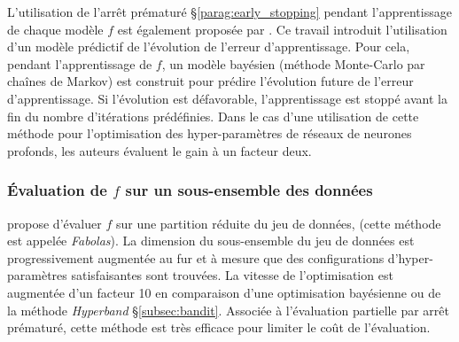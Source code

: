 L'utilisation de l'arrêt prématuré §\ref{parag:early_stopping} pendant l'apprentissage de chaque modèle $f$ est également proposée par \cite{domhan_speeding_2015}.
Ce travail introduit l'utilisation d'un modèle prédictif de l'évolution de l'erreur d'apprentissage.
Pour cela, pendant l'apprentissage de $f$, un modèle bayésien (méthode Monte-Carlo par chaînes de Markov) est construit pour prédire l'évolution future de l'erreur d'apprentissage.
Si l'évolution est défavorable, l'apprentissage est stoppé avant la fin du nombre d'itérations prédéfinies.
Dans le cas d'une utilisation de cette méthode pour l'optimisation des hyper-paramètres de réseaux de neurones profonds, les auteurs évaluent le gain à un facteur deux.

\subsubsection{Évaluation de $f$ sur un sous-ensemble des données} \label{subsec:subsampling}
\cite{klein_fast_2016} propose d'évaluer $f$ sur une partition réduite du jeu de données, (cette méthode est appelée \textit{Fabolas}).
La dimension du sous-ensemble du jeu de données est progressivement augmentée au fur et à mesure que des configurations d'hyper-paramètres satisfaisantes sont trouvées.
La vitesse de l'optimisation est augmentée d'un facteur 10 en comparaison d'une optimisation bayésienne ou de la méthode \textit{Hyperband} §\ref{subsec:bandit}.
Associée à l'évaluation partielle par arrêt prématuré, cette méthode est très efficace pour limiter le coût de l'évaluation.

